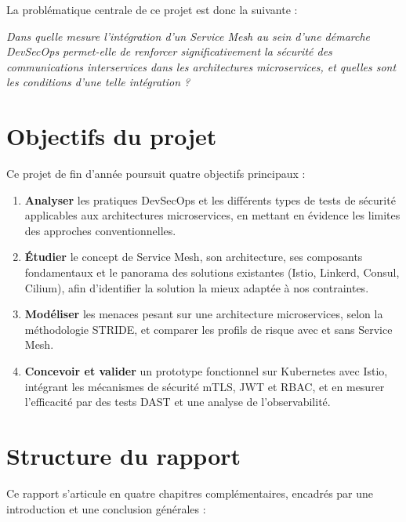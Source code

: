 La problématique centrale de ce projet est donc la suivante :

\begin{tcolorbox}[
  colback=gray!6, colframe=darkgray,
  fonttitle=\bfseries, title={Question de recherche},
  arc=4pt
]
  \textit{Dans quelle mesure l'intégration d'un Service Mesh au sein d'une
  démarche DevSecOps permet-elle de renforcer significativement la sécurité
  des communications interservices dans les architectures microservices, et
  quelles sont les conditions d'une telle intégration ?}
\end{tcolorbox}

\section*{Objectifs du projet}

Ce projet de fin d'année poursuit quatre objectifs principaux :

\begin{enumerate}
  \item \textbf{Analyser} les pratiques DevSecOps et les différents types de
    tests de sécurité applicables aux architectures microservices, en mettant
    en évidence les limites des approches conventionnelles.

  \item \textbf{Étudier} le concept de Service Mesh, son architecture, ses
    composants fondamentaux et le panorama des solutions existantes (Istio,
    Linkerd, Consul, Cilium), afin d'identifier la solution la mieux adaptée
    à nos contraintes.

  \item \textbf{Modéliser} les menaces pesant sur une architecture microservices,
    selon la méthodologie STRIDE, et comparer les profils de risque avec et sans
    Service Mesh.

  \item \textbf{Concevoir et valider} un prototype fonctionnel sur Kubernetes avec
    Istio, intégrant les mécanismes de sécurité mTLS, JWT et RBAC, et en mesurer
    l'efficacité par des tests DAST et une analyse de l'observabilité.
\end{enumerate}

\section*{Structure du rapport}

Ce rapport s'articule en quatre chapitres complémentaires, encadrés par une
introduction et une conclusion générales :

